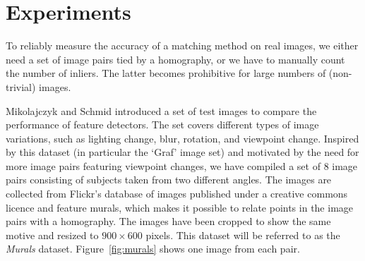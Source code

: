 \documentclass[conference]{IEEEtran}
\begin{document}
%

\section{Experiments}
\label{S:Experiments}
%
To reliably measure the accuracy of a matching method on real images, we 
either need a set of image pairs tied by a homography, or we have to manually count 
the number of inliers. The latter becomes prohibitive for large numbers of (non-trivial) images. 

Mikolajczyk and Schmid  \cite{mikolajczyk2005performance} introduced a set of test images
to compare the performance of feature detectors. The 
set covers different types of image variations, such as lighting change, 
blur, rotation, and viewpoint change. Inspired by this 
dataset (in particular the `Graf' image set) and motivated by 
the need for more image pairs featuring viewpoint changes, we have 
compiled a set of 8 image pairs consisting of subjects taken from two 
different angles. The images are collected from Flickr's database of 
images published under a creative commons 
licence %
and feature murals, which 
makes it possible to relate points in the image pairs with a homography.  
The images have been cropped to show the same motive and resized to 
$900\times 600$ pixels.  This dataset will be referred to as the 
\emph{Murals} dataset.  Figure~\ref{fig:murals} shows one image from each pair.
\end{document}
